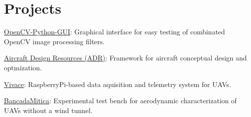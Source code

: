 \documentclass[A4]{deedy-resume} %
\begin{document}
\begin{minipage}[t]{0.67\textwidth}
\begin{tightitemize}
\end{tightitemize}
\sectionspace %




\section{Projects}

\vspace{\topsep}
\begin{tightitemize}
\item \href{https://github.com/rafaellehmkuhl/OpenCV-Python-GUI}{OpenCV-Python-GUI}: Graphical interface for easy testing of combinated OpenCV image processing filters.
\item \href{https://github.com/CeuAzul/ADR}{Aircraft Design Resources (ADR)}: Framework for aircraft conceptual design and optmization.
\item \href{https://github.com/CeuAzul/Vivace}{Vivace}: RaspberryPi-based data aquisition and telemetry system for UAVs.
\item \href{https://github.com/rafaellehmkuhl/Bancada-Mitica-Parts-Models}{BancadaMitica}: Experimental test bench for aerodynamic characterization of UAVs without a wind tunnel.
\end{tightitemize}
 
\sectionspace %

\end{minipage} %

\end{document}

